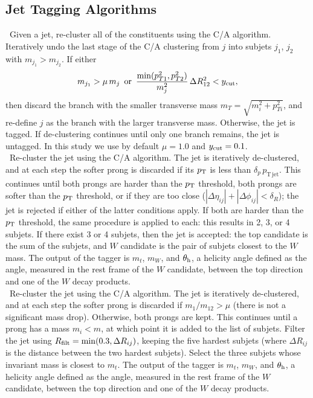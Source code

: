  
 
\subsection{Jet Tagging Algorithms}
\label{sec:taggers}

~Given a jet, re-cluster all of the constituents using the C/A algorithm. Iteratively undo the last stage of the C/A clustering from $j$ into subjets $j_1$, $j_2$ with $m_{j_1}>m_{j_2}$. If either
%
\begin{equation}
m_{j_1} > \mu \, m_j\,\,\,\mathrm{or}\,\,\, \frac{\mathrm{min}(p_{T1}^2,p_{T2}^2)}{m_j^2}\,\Delta R_{12}^2 < y_{\rm cut},
\end{equation}
%
then discard the branch with the smaller transverse mass $m_T = \sqrt{m_i^2 + p_{Ti}^2}$, and re-define $j$ as the branch with the larger transverse mass. Otherwise, the jet is tagged. If de-clustering continues until only one branch remains, the jet is untagged. In this study we use by default $\mu = 1.0$ and $y_{\rm cut} = 0.1$.\\


~Re-cluster the jet using the C/A algorithm. The jet is iteratively de-clustered, and at each step the softer prong is discarded if its $p_{\rm T}$ is less than $\delta_p\,p_{\mathrm{T\,jet}}$. This continues until both prongs are harder than the $p_{\rm T}$ threshold, both prongs are softer than the $p_{\rm T}$ threshold, or if they are too close ($|\Delta\eta_{ij}|+|\Delta\phi_{ij}|<\delta_R$); the jet is rejected if either of the latter conditions apply. If both are harder than the $p_{\rm T}$ threshold, the same procedure is applied to each: this results in 2, 3, or 4 subjets. If there exist 3 or 4 subjets, then the jet is accepted: the top candidate is the sum of the subjets, and $W$ candidate is the pair of subjets closest to the $W$ mass. The output of the tagger is $m_t$, $m_W$, and $\theta_{\rm h}$, a helicity angle defined as the angle, measured in the rest frame of the $W$ candidate, between the top direction and one of the $W$ decay products.\\

~Re-cluster the jet using the C/A algorithm. The jet is iteratively de-clustered, and at each step the softer prong is discarded if $m_1/m_{12}>\mu$ (there is not a significant mass drop). Otherwise, both prongs are kept. This continues until a prong has a mass $m_i < m$, at which point it is added to the list of subjets. Filter the jet using $R_{\rm filt}=\mathrm{min}(0.3,\Delta R_{ij})$, keeping the five hardest subjets (where $\Delta R_{ij}$ is the distance between the two hardest subjets). Select the three subjets whose invariant mass is closest to $m_t$. The output of the tagger is $m_t$, $m_W$, and $\theta_{\rm h}$, a helicity angle defined as the angle, measured in the rest frame of the $W$ candidate, between the top direction and one of the $W$ decay products.\\

